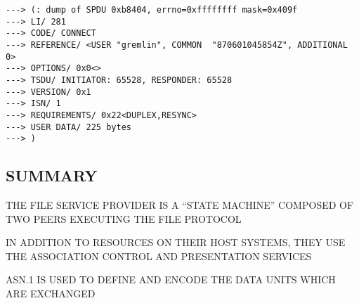 \begin{bwslide}\small
\begin{verbatim}
---> (: dump of SPDU 0xb8404, errno=0xffffffff mask=0x409f
---> LI/ 281
---> CODE/ CONNECT
---> REFERENCE/ <USER "gremlin", COMMON  "870601045854Z", ADDITIONAL 0>
---> OPTIONS/ 0x0<>
---> TSDU/ INITIATOR: 65528, RESPONDER: 65528
---> VERSION/ 0x1
---> ISN/ 1
---> REQUIREMENTS/ 0x22<DUPLEX,RESYNC>
---> USER DATA/ 225 bytes
---> )
\end{verbatim}
\end{bwslide}


\begin{bwslide}
\part*	{SUMMARY}\bf

\begin{nrtc}
\item	THE FILE SERVICE PROVIDER IS A ``STATE MACHINE'' COMPOSED OF TWO
	PEERS EXECUTING THE FILE PROTOCOL

\item	IN ADDITION TO RESOURCES ON THEIR HOST SYSTEMS,
	THEY USE THE ASSOCIATION CONTROL AND PRESENTATION SERVICES

\item	ASN.1 IS USED TO DEFINE AND ENCODE THE DATA UNITS WHICH ARE EXCHANGED
\end{nrtc}
\end{bwslide}
